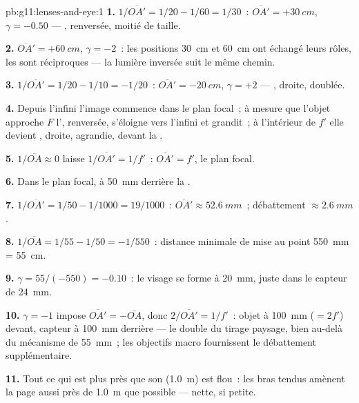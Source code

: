\begin{solution}{pb:g11:lenses-and-eye:1}
\textbf{1.} $1/\overline{OA'} = 1/20 - 1/60 = 1/30$~:
$\overline{OA'} = +\qty{30}{cm}$, $\gamma = -0.50$ ---
, renversée, moitié de taille.

\textbf{2.} $\overline{OA'} = +\qty{60}{cm}$, $\gamma = -2$~: les
positions \qty{30}{cm} et \qty{60}{cm} ont échangé leurs rôles, les
 sont réciproques --- la lumière
inversée suit le même chemin.

\textbf{3.} $1/\overline{OA'} = 1/20 - 1/10 = -1/20$~:
$\overline{OA'} = \qty{-20}{cm}$, $\gamma = +2$ ---
, droite, doublée.

\textbf{4.} Depuis l'infini l'image commence dans le plan focal~; à
mesure que l'objet approche $F$ l', renversée, s'éloigne vers l'infini et
grandit~; à l'intérieur de $f'$ elle devient
, droite, agrandie, devant la
.

\textbf{5.} $1/\overline{OA} \approx 0$ laisse
$1/\overline{OA'} = 1/f'$~: $\overline{OA'} = f'$, le plan focal.

\textbf{6.} Dans le plan focal, à \qty{50}{mm} derrière la
.

\textbf{7.} $1/\overline{OA'} = 1/50 - 1/1000 = 19/1000$~:
$\overline{OA'} \approx \qty{52.6}{mm}$~; débattement
$\approx \qty{2.6}{mm}$.

\textbf{8.} $1/\overline{OA} = 1/55 - 1/50 = -1/550$~: distance minimale
de mise au point \qty{550}{mm} = \qty{55}{cm}.

\textbf{9.} $\gamma = 55/(-550) = -0.10$~: le visage se forme à
\qty{20}{mm}, juste dans le capteur de \qty{24}{mm}.

\textbf{10.} $\gamma = -1$ impose
$\overline{OA'} = -\overline{OA}$, donc $2/\overline{OA'} = 1/f'$~:
objet à \qty{100}{mm} ($= 2f'$) devant, capteur à \qty{100}{mm}
derrière --- le double du tirage paysage, bien au-delà du mécanisme de
\qty{55}{mm}~; les objectifs macro fournissent le débattement
supplémentaire.

\textbf{11.} Tout ce qui est plus près que son
 (\qty{1.0}{m}) est flou~: les bras
tendus amènent la page aussi près de \qty{1.0}{m} que possible ---
nette, si petite.


\end{solution}
